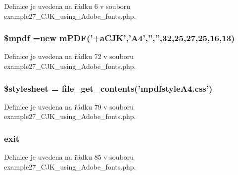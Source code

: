 Definice je uvedena na řádku 6 v souboru example27\-\_\-\-C\-J\-K\-\_\-using\-\_\-\-Adobe\-\_\-fonts.\-php.

\hypertarget{example27___c_j_k__using___adobe__fonts_8php_ad028f81910d6cbab9b184d2214b3a8f8}{
\subsubsection[{\$mpdf}]{\setlength{\rightskip}{0pt plus 5cm}\$mpdf =new {\bf m\-P\-D\-F}('+a\-C\-J\-K','A4','','',32,25,27,25,16,13)}}\label{example27___c_j_k__using___adobe__fonts_8php_ad028f81910d6cbab9b184d2214b3a8f8}


Definice je uvedena na řádku 72 v souboru example27\-\_\-\-C\-J\-K\-\_\-using\-\_\-\-Adobe\-\_\-fonts.\-php.

\hypertarget{example27___c_j_k__using___adobe__fonts_8php_a19e5cf73e817c55a49205e6ec78c88a8}{
\subsubsection[{\$stylesheet}]{\setlength{\rightskip}{0pt plus 5cm}\$stylesheet = file\-\_\-get\-\_\-contents('mpdfstyle\-A4.\-css')}}\label{example27___c_j_k__using___adobe__fonts_8php_a19e5cf73e817c55a49205e6ec78c88a8}


Definice je uvedena na řádku 79 v souboru example27\-\_\-\-C\-J\-K\-\_\-using\-\_\-\-Adobe\-\_\-fonts.\-php.

\hypertarget{example27___c_j_k__using___adobe__fonts_8php_a6733eb5f605d09eaede9845835d71c4e}{
\subsubsection[{exit}]{\setlength{\rightskip}{0pt plus 5cm}exit}}\label{example27___c_j_k__using___adobe__fonts_8php_a6733eb5f605d09eaede9845835d71c4e}


Definice je uvedena na řádku 85 v souboru example27\-\_\-\-C\-J\-K\-\_\-using\-\_\-\-Adobe\-\_\-fonts.\-php.

